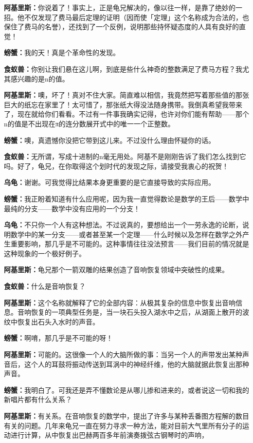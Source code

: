 \documentclass[
  12pt,
  twoside,
  openright,
  oldfontcommands,
]{memoir}
\newcommand{\dialogname}[1]{{\heifamily\bfseries #1}}
\begin{document}
\dialogname{阿基里斯：}你说着了！事实上，正是龟兄解决的，像以往一样，是靠了绝妙的一招。他不仅发现了费马最后定理的证明（因而使「定理」这个名称成为合法的，也保住了费马的名誉），还找到了一个反例，说明那些持怀疑态度的人具有良好的直觉！

\dialogname{螃蟹：}我的天！真是个革命性的发现。

\dialogname{食蚁兽：}你别让我们悬在这儿啊，到底是些什么神奇的整数满足了费马方程？我尤其感兴趣的是n的值。

\dialogname{阿基里斯：}噢，坏了！真对不住大家。简直难以相信，我竟然把写着那些值的那张巨大的纸忘在家里了！太可惜了，那张纸大得没法随身携带。我倒真希望我带来了，现在就给你们看看。不过有一件事我确实记得，也许对你们能有帮助------那个n的值是不出现在π的连分数展开式中的唯一一个正整数。

\dialogname{螃蟹：}噢，真遗憾你没把它带到这儿来。不过没什么理由怀疑你的话。

\dialogname{食蚁兽：}无所谓，写成十进制的n毫无用处。阿基不是刚刚告诉了我们怎么找到它吗。好了，龟兄，在你取得这个划时代的发现之际，请接受我衷心的祝贺！

\dialogname{乌龟：}谢谢。可我觉得比结果本身更重要的是它直接导致的实际应用。

\dialogname{螃蟹：}我正盼着知道有什么应用呢，因为我一直觉得数论是数学的王后------数学中最纯的分支------数学中没有应用的一个分支！

\dialogname{乌龟：}不只你一个人有这种想法。不过说真的，要想给出一个一劳永逸的论断，说明数学中的某一分支------或者甚至某一个定理------什么时候以及怎样在数学之外产生重要影响，那几乎是不可能的。这种事情往往没法预言------我们目前的情况就是这种现象的一个极好例子。

\dialogname{阿基里斯：}龟兄那个一箭双雕的结果创造了音响恢复领域中突破性的成果。

\dialogname{食蚁兽：}什么是音响恢复？

\dialogname{阿基里斯：}这个名称就解释了它的全部内容：从极其复杂的信息中恢复出音响信息。音响恢复的一项典型任务是，当一块石头投入湖水中之后，从湖面上散开的波纹中恢复出石头入水时的声音。

\dialogname{螃蟹：}啊唷，那几乎是不可能的呀！

\dialogname{阿基里斯：}可能的。这很像一个人的大脑所做的事：当另一个人的声带发出某种声音后，这个人的耳鼓将振动传送到耳涡中的神经纤维，他的大脑就据此恢复出那种声音。

\dialogname{螃蟹：}我明白了。可我还是弄不懂数论是从哪儿掺和进来的，或者说这一切和我的新唱片都有什么关系？

\dialogname{阿基里斯：}有关系。在音响恢复的数学中，提出了许多与某种丢番图方程解的数目有关的问题。几年来龟兄一直在努力寻求一种方法，能对目前大气里所有分子的运动进行计算，从中恢复出巴赫两百多年前演奏拨弦古钢琴时的声响，
\end{document}
